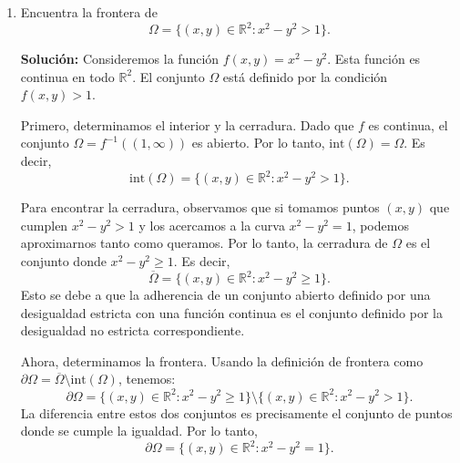 \documentclass[12pt]{article}
\newcommand{\Int}{\mathrm{int}}
\newcommand{\R}{\mathbb R}
\begin{document}
\begin{enumerate}
\begin{enumerate}
    \item \textbf{Condición sobre $y,z$:}
    \begin{itemize}
        \item Si $y^2 + z^2 = 1$ (el punto está en la superficie lateral del cilindro), cualquier bola centrada en el punto contendrá puntos con $y'^2 + z'^2 > 1$, los cuales no están en $\Omega$. Por lo tanto, estos puntos no pueden estar en el interior.
        \item Si $y^2 + z^2 < 1$, podemos elegir un $\varepsilon > 0$ lo suficientemente pequeño de modo que si $(y',z')$ está cerca de $(y,z)$, entonces $y'^2 + z'^2 < 1$. Así, la condición sobre $y,z$ no es un obstáculo para estar en el interior.
    \end{itemize}
\end{enumerate}

Combinando ambas condiciones, concluimos que los puntos del interior deben cumplir estrictamente ambas desigualdades. Por lo tanto,
\[
\Int(\Omega) = \{ (x,y,z)\in \R^3 : 0 < x < 1, \ y^2+z^2 < 1 \}.
\]

Este conjunto es un cilindro abierto de radio 1, con eje en el eje $x$, y con tapas abiertas en $x=0$ y $x=1$.

\item Encuentra la frontera de 
\[ \Omega = \{ (x,y)\in \R^2 : x^2 - y^2 > 1 \}. \]

\textbf{Solución: }
Consideremos la función $f(x,y) = x^2 - y^2$. Esta función es continua en todo $\R^2$. El conjunto $\Omega$ está definido por la condición $f(x,y) > 1$.

Primero, determinamos el interior y la cerradura. Dado que $f$ es continua, el conjunto $\Omega = f^{-1}((1, \infty))$ es abierto. Por lo tanto, $\Int(\Omega) = \Omega$. Es decir,
\[
\Int(\Omega) = \{ (x,y)\in \R^2 : x^2 - y^2 > 1 \}.
\]

Para encontrar la cerradura, observamos que si tomamos puntos $(x,y)$ que cumplen $x^2 - y^2 > 1$ y los acercamos a la curva $x^2 - y^2 = 1$, podemos aproximarnos tanto como queramos. Por lo tanto, la cerradura de $\Omega$ es el conjunto donde $x^2 - y^2 \geq 1$. Es decir,
\[
\overline{\Omega} = \{ (x,y)\in \R^2 : x^2 - y^2 \geq 1 \}.
\]
Esto se debe a que la adherencia de un conjunto abierto definido por una desigualdad estricta con una función continua es el conjunto definido por la desigualdad no estricta correspondiente.

Ahora, determinamos la frontera. Usando la definición de frontera como $\partial \Omega = \overline{\Omega} \setminus \Int(\Omega)$, tenemos:
\[
\partial \Omega = \{ (x,y)\in \R^2 : x^2 - y^2 \geq 1 \} \setminus \{ (x,y)\in \R^2 : x^2 - y^2 > 1 \}.
\]
La diferencia entre estos dos conjuntos es precisamente el conjunto de puntos donde se cumple la igualdad. Por lo tanto,
\[
\partial \Omega = \{ (x,y)\in \R^2 : x^2 - y^2 = 1 \}.
\]


\end{enumerate}
\end{document}
